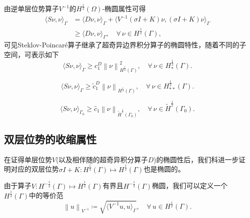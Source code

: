 由逆单层位势算子$V^{-1}$的$H^{\frac{1}{2}}(\Omega)$-椭圆属性可得
\begin{equation}
  \label{eq:bvp-bie-spo-ellipticity}
  \begin{split}
    \langle S \nu, \nu \rangle_{\Gamma}
    &= \langle D \nu, \nu \rangle_{\Gamma}
    + \langle V^{-1} \left( \sigma I + K \right) \nu,
    \left(\sigma I + K \right) \nu \rangle_{\Gamma} \\
    & \ge \langle D \nu, \nu \rangle_{\Gamma}, \quad \forall \, \nu \in H^{\frac{1}{2}}(\Gamma),
  \end{split}
\end{equation}
可见Steklov-Poincaré算子继承了超奇异边界积分算子的椭圆特性，随着不同的子空间，可表示如下
\begin{equation}
  \label{eq:bvp-bie-spo-ellipticity-subspace-star}
  \langle S \nu, \nu \rangle_{\Gamma} \ge c_{1}^{D} \left\| \nu \right\|_{H^{\frac{1}{2}}(\Gamma)}^{2}, \quad \forall \, \nu \in H_{*}^{\frac{1}{2}}(\Gamma).
\end{equation}

\begin{equation}
  \label{eq:bvp-bie-spo-ellipticity-subspace-starstar}
  \langle S \nu, \nu \rangle_{\Gamma} \ge \widetilde{c}_{1}^{D}
  \left\| \nu \right\|_{H^{\frac{1}{2}}(\Gamma)}, \quad \forall \, \nu \in H_{**}^{\frac{1}{2}}(\Gamma).
\end{equation}

\begin{equation}
    \label{eq:bvp-bie-spo-ellipticity-subspace-gamma0}
    \langle S \nu, \nu \rangle_{\Gamma_{0}} \ge \hat{c}_{1} \left\|
    \nu \right\|_{\widetilde{H}^{\frac{1}{2}}(\Gamma_{0})}, \quad \forall \, \nu \in \widetilde{H}^{\frac{1}{2}}(\Gamma_{0}).
\end{equation}

\subsection{双层位势的收缩属性}
\label{sec:bvp-bie-double-layer-contraction}
在证得单层位势$V$(以及相伴随的超奇异积分算子$D$)的椭圆性后，我们科进一步证明对应的双层位势$\sigma I + K : H^{\frac{1}{2}}(\Gamma) \mapsto H^{\frac{1}{2}}(\Gamma)$也是椭圆的\citep{Steinbach:2001he}。

由于算子$V: H^{-\frac{1}{2}}(\Gamma) \mapsto H^{\frac{1}{2}}(\Gamma)$有界且$H^{-\frac{1}{2}}(\Gamma)$椭圆，我们可以定义一个$H^{\frac{1}{2}}(\Gamma)$中的等价范
\begin{equation}
  \label{eq:bvp-bie-unorm-vinverse}
  \left\| u \right\|_{V^{-1}} \coloneqq \sqrt{
  \langle V^{-1} u, u \rangle_{\Gamma}
  }, \quad \forall \, u \in H^{\frac{1}{2}}(\Gamma).
\end{equation}

